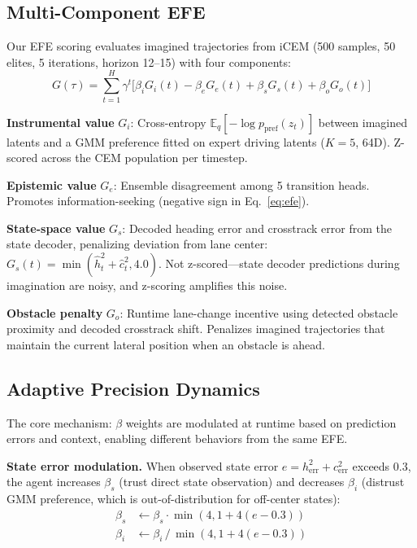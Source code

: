 \documentclass{article}
\begin{document}
\subsection{Multi-Component EFE}

Our EFE scoring evaluates imagined trajectories from iCEM (500
samples, 50 elites, 5 iterations, horizon 12--15) with four
components:
\begin{equation}
    G(\tau) = \sum_{t=1}^{H} \gamma^t \Big[
    \beta_i G_i(t) - \beta_e G_e(t) + \beta_s G_s(t) + \beta_o G_o(t)
    \Big]
\label{eq:efe}
\end{equation}

\textbf{Instrumental value} $G_i$: Cross-entropy
$\mathbb{E}_q[-\log p_{\text{pref}}(z_t)]$ between imagined
latents and a GMM preference fitted on expert driving latents
($K{=}5$, 64D). Z-scored across the CEM population per timestep.

\textbf{Epistemic value} $G_e$: Ensemble disagreement among 5
transition heads. Promotes information-seeking (negative sign in
Eq.~\ref{eq:efe}).

\textbf{State-space value} $G_s$: Decoded heading error and
crosstrack error from the state decoder, penalizing deviation from
lane center: $G_s(t) = \min(\hat{h}_t^2 + \hat{c}_t^2, 4.0)$.
Not z-scored---state decoder predictions during imagination are
noisy, and z-scoring amplifies this noise.

\textbf{Obstacle penalty} $G_o$: Runtime lane-change incentive
using detected obstacle proximity and decoded crosstrack shift.
Penalizes imagined trajectories that maintain the current lateral
position when an obstacle is ahead.

\subsection{Adaptive Precision Dynamics}
\label{sec:precision}

The core mechanism: $\beta$ weights are modulated at runtime based
on prediction errors and context, enabling different behaviors from
the same EFE.

\textbf{State error modulation.} When observed state error
$e = h_{\text{err}}^2 + c_{\text{err}}^2$ exceeds 0.3, the agent
increases $\beta_s$ (trust direct state observation) and decreases
$\beta_i$ (distrust GMM preference, which is out-of-distribution
for off-center states):
\begin{align}
    \beta_s &\leftarrow \beta_s \cdot \min(4, 1 + 4(e - 0.3)) \\
    \beta_i &\leftarrow \beta_i \, / \, \min(4, 1 + 4(e - 0.3))
\end{align}
\end{document}
